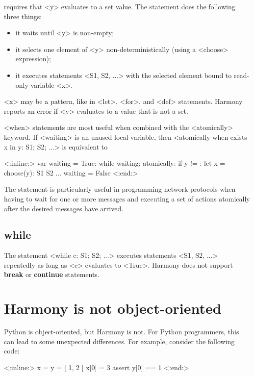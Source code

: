 \documentclass{report}
\newenvironment{code}{
\tcolorbox
}{
\endtcolorbox
}
\begin{document}
requires that <{y}> evaluates to a set value.
The statement does the following three things:
\begin{itemize}
\item it waits until <{y}> is non-empty;
\item it selects one element of <{y}> non-deterministically (using
a <{choose}> expression);
\item it executes statements <{S1, S2, ...}> with the selected element
bound to read-only variable <{x}>.
\end{itemize}
<{x}> may be a pattern, like in <{let}>, <{for}>, and <{def}>
statements.
Harmony reports an error if <{y}> evaluates to a value that is not a set.

<{when}> statements are most useful when combined with the
<{atomically}> keyword.
If <{waiting}> is an unused local variable,
then <{atomically when exists x in y: S1; S2; ...}> is equivalent to

\begin{code}
<{:inline:}>
var waiting = True:
    while waiting:
        atomically:
            if y != {}:
                let x = choose(y):
                    S1
                    S2
                    ...
                waiting = False
<{:end:}>
\end{code}

The statement is particularly useful in programming network protocols
when having to wait for one or more messages and executing a set
of actions atomically after the desired messages have arrived.

\subsection*{\textbf{while}}

The statement <{while c: S1; S2; ...}> executes statements
<{S1, S2, ...}> repeatedly as long as <{c}> evaluates to <{True}>.
Harmony does not support \textbf{break} or \textbf{continue} statements.

\section{Harmony is not object-oriented}

Python is object-oriented, but Harmony is not.  For Python programmers,
this can lead to some unexpected differences.
For example, consider the following code:

\begin{code}
<{:inline:}>
x = y = [ 1, 2 ]
x[0] = 3
assert y[0] == 1
<{:end:}>
\end{code}
\end{document}
